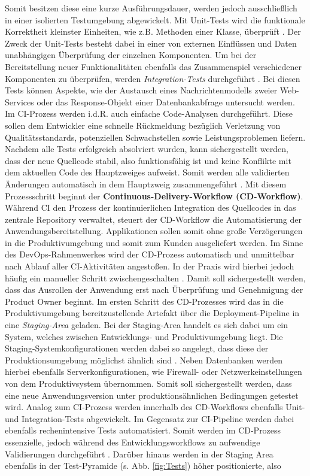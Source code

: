 Somit besitzen diese eine kurze Ausführungsdauer, werden jedoch ausschließlich in einer isolierten Testumgebung abgewickelt. Mit Unit-Tests wird die funktionale Korrektheit kleinster Einheiten, wie z.B. Methoden einer Klasse, über\-prüft \cite[177]{Jamil.1122201611242016}. Der Zweck der Unit-Tests besteht dabei in einer von externen Einflüssen und Daten unabhängigen Überprüfung der einzelnen Komponenten. Um bei der Bereitstellung neuer Funktionalitäten ebenfalls das Zusammenspiel verschiedener Komponenten zu überprüfen, werden \textit{Integration-Tests} durchgeführt \cite[177]{Jamil.1122201611242016}. Bei diesen Tests können Aspekte, wie der Austausch eines Nachrichtenmodells zweier Web-Services oder das Response-Objekt einer Datenbankabfrage untersucht werden. Im CI-Prozess werden i.d.R. auch einfache Code-Analysen durchgeführt. Diese sollen dem Entwickler eine schnelle Rückmeldung bezüglich Verletzung von Qualitätsstandards, potenziellen Schwachstellen sowie Leistungsproblemen liefern. Nachdem alle Tests erfolgreich absolviert wurden, kann sichergestellt werden, dass der neue Quellcode stabil, also funktionsfähig ist und keine Konflikte mit dem aktuellen Code des Hauptzweiges aufweist. Somit werden alle validierten Änderungen automatisch in dem Hauptzweig zusammengeführt \cite[S. 19 ff.]{Halstenberg.2020}. Mit diesem Prozessschritt beginnt der \textbf{Continuous-Delivery-Workflow (\acs{CD}-Workflow)}.\\ Während CI den Prozess der kontinuierlichen Integration des Quellcodes in das zentrale Repository verwaltet, steuert der CD-Workflow die Automatisierung der Anwendungsbereitstellung. Applikationen sollen somit ohne große Verzögerungen in die Produktivumgebung und somit zum Kunden ausgeliefert werden. Im Sinne des DevOps-Rahmenwerkes wird der CD-Prozess automatisch und unmittelbar nach Ablauf aller CI-Aktivitäten angestoßen. In der Praxis wird hierbei jedoch häufig ein manueller Schritt zwischengeschalten \cite[S. 19 ff.]{Halstenberg.2020}. Damit soll sichergestellt werden, dass das Ausrollen der Anwendung erst nach Überprüfung und Genehmigung der Product Owner beginnt. Im ersten Schritt des CD-Prozesses wird das in die Produktivumgebung bereitzustellende Artefakt über die Deployment-Pipeline in eine \textit{Staging-Area} geladen. Bei der Staging-Area handelt es sich dabei um ein System, welches zwischen Entwicklungs- und Produktivumgebung liegt. Die Staging-Systemkonfigurationen werden dabei so angelegt, dass diese der Produktionsumgebung möglichst ähnlich sind \cite{Reynolds.20220203}. Neben Datenbanken werden hierbei ebenfalls Serverkonfigurationen, wie Firewall- oder Netzwerkeinstellungen von dem Produktivsystem übernommen. Somit soll sichergestellt werden, dass eine neue Anwendungsversion unter produktionsähnlichen Bedingungen getestet wird. Analog zum CI-Prozess werden innerhalb des CD-Workflows ebenfalls Unit- und Integration-Tests abgewickelt. Im Gegensatz zur CI-Pipeline werden dabei ebenfalls rechenintensive Tests automatisiert. Somit werden im CD-Prozess essenzielle, jedoch während des Entwicklungsworkflows zu aufwendige Validierungen durchgeführt \cite[20]{Halstenberg.2020}. Darüber hinaus werden in der Staging Area ebenfalls in der Test-Pyramide (s. Abb. \ref{fig:Tests}) höher positionierte, also 